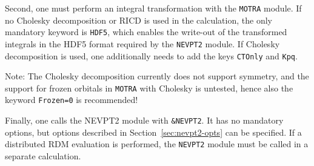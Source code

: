 \documentclass[bibliography=totoc,12pt,a4paper]{scrartcl}
\newcommand{\kwd}[1]{\texttt{#1}}
\begin{document}
Second, one must perform an integral transformation with the \kwd{MOTRA} module. If no Cholesky decomposition or RICD is used in the calculation, the only mandatory keyword is \kwd{HDF5}, which enables the write-out of the transformed integrals in the HDF5 format required by the \kwd{NEVPT2} module. If Cholesky decomposition is used, one additionally needs to add the keys \kwd{CTOnly} and \kwd{Kpq}.

\begin{framed}
 \noindent Note: The Cholesky decomposition currently does not support symmetry, and the support for frozen orbitals in \kwd{MOTRA} with Cholesky is untested, hence also the keyword \kwd{Frozen=0} is recommended!
\end{framed}

Finally, one calls the NEVPT2 module with \kwd{\&NEVPT2}. It has no mandatory options, but options described in Section~\ref{sec:nevpt2-opts} can be specified. If a distributed RDM evaluation is performed, the \kwd{NEVPT2} module must be called in a separate calculation.
\end{document}
